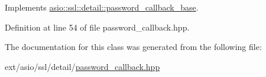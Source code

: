 Implements \hyperlink{classasio_1_1ssl_1_1detail_1_1password__callback__base_a0921e1cba762d2b75cd198ed2bac110a}{asio\+::ssl\+::detail\+::password\+\_\+callback\+\_\+base}.



Definition at line 54 of file password\+\_\+callback.\+hpp.



The documentation for this class was generated from the following file\+:\begin{DoxyCompactItemize}
\item 
ext/asio/ssl/detail/\hyperlink{password__callback_8hpp}{password\+\_\+callback.\+hpp}\end{DoxyCompactItemize}
